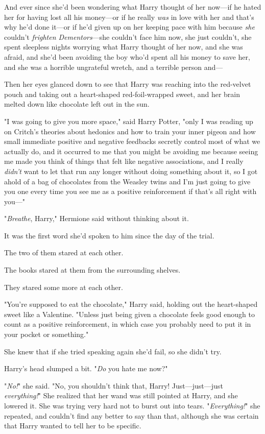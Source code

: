 And ever since she'd been wondering what Harry thought of her now---if he hated 
her for having lost all his money---or if he really\emph{ was} in love with her 
and that's why he'd done it---or if he'd given up on her keeping pace with him 
because \emph{she} couldn't \emph{frighten Dementors}---she couldn't face him 
now, she just couldn't, she spent sleepless nights worrying what Harry thought 
of her now, and she was afraid, and she'd been avoiding the boy who'd spent all 
his money to save her, and she was a horrible ungrateful wretch, and a terrible 
person and---

Then her eyes glanced down to see that Harry was reaching into the red-velvet 
pouch and taking out a heart-shaped red-foil-wrapped sweet, and her brain 
melted down like chocolate left out in the sun.

"I was going to give you more space," said Harry Potter, "only I was reading up 
on Critch's theories about hedonics and how to train your inner pigeon and how 
small immediate positive and negative feedbacks secretly control most of what 
we actually do, and it occurred to me that you might be avoiding me because 
seeing me made you think of things that felt like negative associations, and I 
really \emph{didn't} want to let that run any longer without doing something 
about it, so I got ahold of a bag of chocolates from the Weasley twins and I'm 
just going to give you one every time you see me as a positive reinforcement if 
that's all right with you---"

"\emph{Breathe}, Harry," Hermione said without thinking about it.

It was the first word she'd spoken to him since the day of the trial.

The two of them stared at each other.

The books stared at them from the surrounding shelves.

They stared some more at each other.

"You're supposed to eat the chocolate," Harry said, holding out the 
heart-shaped sweet like a Valentine. "Unless just being given a chocolate feels 
good enough to count as a positive reinforcement, in which case you probably 
need to put it in your pocket or something."

She knew that if she tried speaking again she'd fail, so she didn't try.

Harry's head slumped a bit. "\emph{Do} you hate me now?"

"\emph{No!}" she said. "No, you shouldn't think that, Harry! Just---just---just 
\emph{everything!}" She realized that her wand was still pointed at Harry, and 
she lowered it. She was trying very hard not to burst out into tears. 
"\emph{Everything!}" she repeated, and couldn't find any better to say than 
that, although she was certain that Harry wanted to tell her to be specific.

